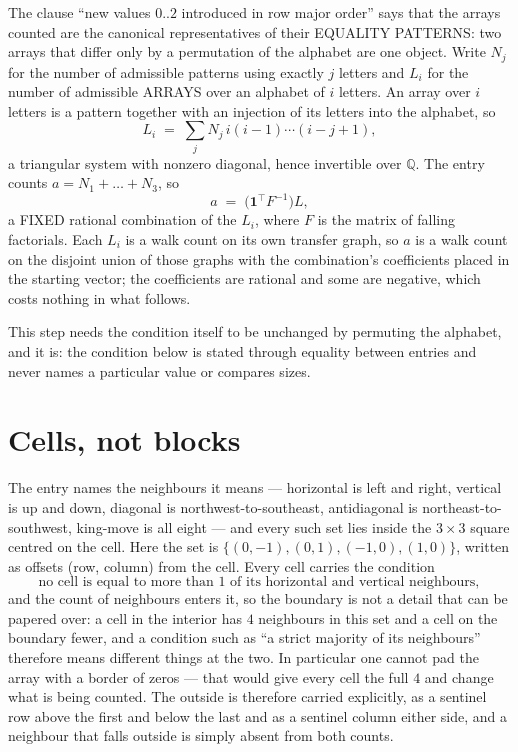 \documentclass[11pt,a4paper]{article}
\theoremstyle{plain}
\theoremstyle{definition}
\begin{document}
The clause ``new values $0..2$ introduced in row major order'' says that the arrays
counted are the canonical representatives of their EQUALITY PATTERNS: two arrays that differ
only by a permutation of the alphabet are one object. Write $N_j$ for the number of admissible
patterns using exactly $j$ letters and $L_i$ for the number of admissible ARRAYS over an
alphabet of $i$ letters. An array over $i$ letters is a pattern together with an injection of
its letters into the alphabet, so
\[
L_i\;=\;\sum_{j}N_j\,i(i-1)\cdots(i-j+1),
\]
a triangular system with nonzero diagonal, hence invertible over $\mathbb{Q}$. The entry
counts $a=N_1+\dots+N_{3}$, so
\[
a\;=\;\bigl(\mathbf{1}^{\!\top}F^{-1}\bigr)L ,
\]
a FIXED rational combination of the $L_i$, where $F$ is the matrix of falling factorials.
Each $L_i$ is a walk count on its own transfer graph, so $a$ is a walk count on the disjoint
union of those graphs with the combination's coefficients placed in the starting vector; the
coefficients are rational and some are negative, which costs nothing in what follows.

This step needs the condition itself to be unchanged by permuting the alphabet, and it is:
the condition below is stated through equality between entries and never names a particular
value or compares sizes.

\section{Cells, not blocks}

The entry names the neighbours it means --- horizontal is left and right, vertical is up and
down, diagonal is northwest-to-southeast, antidiagonal is northeast-to-southwest, king-move is
all eight --- and every such set lies inside the $3\times3$ square centred on the cell. Here
the set is $\{(0,-1), (0,1), (-1,0), (1,0)\}$, written as offsets (row, column) from the cell. Every cell carries
the condition
\[
\text{no cell is equal to more than 1 of its horizontal and vertical neighbours},
\]
and the count of neighbours enters it, so the boundary is not a detail that can be papered
over: a cell in the interior has $4$ neighbours in this set and a cell on the boundary
fewer, and a condition such as ``a strict majority of its neighbours'' therefore means
different things at the two. In particular one cannot pad the array with a border of zeros ---
that would give every cell the full $4$ and change what is being counted. The outside is
therefore carried
explicitly, as a sentinel row above the first and below the last and as a sentinel column
either side, and a neighbour that falls outside is simply absent from both counts.
\end{document}
